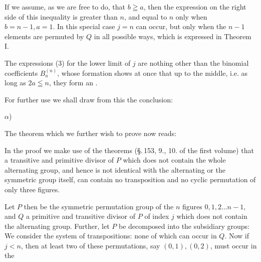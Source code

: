 If we assume, as we are free to do, that $b \geqq a$, then the
expression on the right side of this inequality is greater
than $n$, and equal to $n$ only when $b = n - 1, a = 1$. In
this special case $j = n$ can occur, but only when
the $n - 1$ elements are permuted by $Q$ in all possible ways,
which is expressed in Theorem I.

The expressions (3) for the lower limit of $j$ are nothing
other than the binomial coefficients $B_a^{(n)}$, whose formation
shows at once that up to the middle, i.e. as long as $2a \leqq n$,
they form an .

For further use we shall draw from this the
conclusion:

$\alpha$) 

The theorem which we further wish to prove now reads:


In the proof we make use of the theorems (\S.\,153,
9., 10. of the first volume) that a transitive and primitive
divisor of $P$ which does not contain the whole alternating group,
and hence is not identical with the alternating or the symmetric
group itself, can contain no transposition and no
cyclic permutation of only three figures.

Let $P$ then be the symmetric permutation group of the
$n$ figures $0, 1, 2 \dots n - 1$, and $Q$ a primitive and transitive
divisor of $P$ of index $j$ which does not contain the alternating
group. Further, let $P$ be decomposed into the subsidiary groups:
We consider the system of transpositions:
none of which can occur in $Q$. Now if $j < n$, then at least
two of these permutations, say $(0,1), (0,2)$, must occur in the
